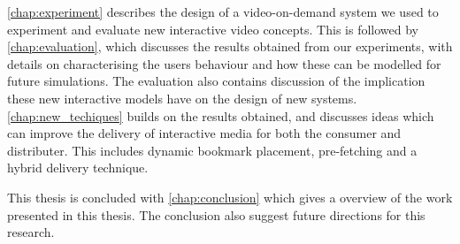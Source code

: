 \autoref{chap:experiment} describes the design of a video-on-demand system we used to experiment and evaluate new interactive video concepts. This is followed by \autoref{chap:evaluation}, which discusses the results obtained from our experiments, with details on characterising the users behaviour and how these can be modelled for future simulations. The evaluation also contains discussion of the implication these new interactive models have on the design of new systems. \autoref{chap:new_techiques} builds on the results obtained, and discusses ideas which can improve the delivery of interactive media for both the consumer and distributer. This includes dynamic bookmark placement, pre-fetching and a hybrid delivery technique.

This thesis is concluded with \autoref{chap:conclusion} which gives a overview of the work presented in this thesis. The conclusion also suggest future directions for this research. 